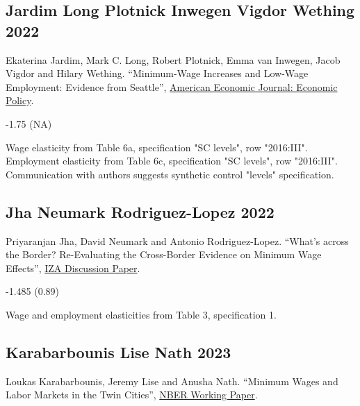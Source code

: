 \subsection*{Jardim Long Plotnick Inwegen Vigdor Wething 2022}
\vspace{-0.7em}

\noindent Ekaterina Jardim, Mark C. Long, Robert Plotnick, Emma van Inwegen, Jacob Vigdor and Hilary Wething. ``Minimum-Wage Increases and Low-Wage Employment: Evidence from Seattle'', \href{https://doi.org/10.1257/pol.20180578}{American Economic Journal: Economic Policy}.

\vspace{0.7em}

 -1.75 (NA)

\vspace{0.7em}

 Wage elasticity from Table 6a, specification "SC levels", row "2016:III". Employment elasticity from Table 6c, specification "SC levels", row "2016:III". Communication with authors suggests synthetic control "levels" specification.

\subsection*{Jha Neumark Rodriguez-Lopez 2022}
\vspace{-0.7em}

\noindent Priyaranjan Jha, David Neumark and Antonio Rodriguez-Lopez. ``What’s across the Border? Re-Evaluating the Cross-Border Evidence on Minimum Wage Effects'', \href{https://docs.iza.org/dp15282.pdf}{IZA Discussion Paper}.

\vspace{0.7em}

 -1.485 (0.89)

\vspace{0.7em}

 Wage and employment elasticities from Table 3, specification 1.

\subsection*{Karabarbounis Lise Nath 2023}
\vspace{-0.7em}

\noindent Loukas Karabarbounis, Jeremy Lise and Anusha Nath. ``Minimum Wages and Labor Markets in the Twin Cities'', \href{https://www.nber.org/system/files/working_papers/w30239/w30239.pdf}{NBER Working Paper}.

